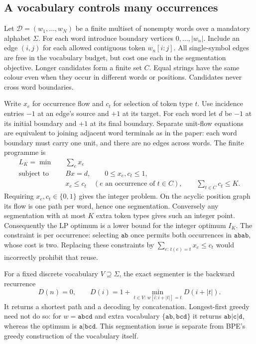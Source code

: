 \documentclass[11pt,oneside,openany]{book}
\theoremstyle{definition}\newtheorem{definition}[theorem]{Definition}
\theoremstyle{remark}\newtheorem{remark}[theorem]{Remark}
\begin{document}
\subsection{A vocabulary controls many occurrences}
Let $\mathcal D=(w_1,\ldots,w_N)$ be a finite multiset of nonempty words over
a mandatory alphabet $\Sigma$. For each word introduce boundary vertices
$0,\ldots,|w_n|$. Include an edge $(i,j)$ for each allowed contiguous token
$w_n[i:j]$. All single-symbol edges are free in the vocabulary budget,
but cost one each in the segmentation objective. Longer candidates form
a finite set $C$. Equal strings have the same colour even when they occur
in different words or positions. Candidates never cross word boundaries.

Write $x_e$ for occurrence flow and $c_t$ for selection of token type $t$.
Use incidence entries $-1$ at an edge's source and $+1$ at its target.
For each word let $d$ be $-1$ at its initial boundary and $+1$ at its final
boundary. Separate unit-flow equations are equivalent to joining adjacent
word terminals as in the paper: each word boundary must carry one unit,
and there are no edges across words. The finite programme is
\begin{equation}\label{convextok:lp}
 \begin{aligned}
 L_K=\min\quad &\sum_e x_e\\
 \text{subject to}\quad &Bx=d,\qquad 0\le x_e,c_t\le1,\\
 &x_e\le c_t\quad(e\text{ an occurrence of }t\in C),\qquad
 \sum_{t\in C}c_t\le K.
 \end{aligned}
\end{equation}
Requiring $x_e,c_t\in\{0,1\}$ gives the integer problem. On the acyclic
position graph its flow is one path per word, hence one segmentation.
Conversely any segmentation with at most $K$ extra token types gives such
an integer point. Consequently the LP optimum is a lower bound for the
integer optimum $I_K$. The constraint is per occurrence: selecting
$\mathtt{ab}$ once permits both occurrences in $\mathtt{abab}$, whose
cost is two. Replacing these constraints by
$\sum_{e:\,t(e)=t}x_e\le c_t$ would incorrectly prohibit that reuse.

For a fixed discrete vocabulary $V\supseteq\Sigma$, the exact segmenter is
the backward recurrence
\[
 D(n)=0,\qquad
 D(i)=1+\min_{t\in V:\,w[i:i+|t|]=t}D(i+|t|).
\]
It returns a shortest path and a decoding by concatenation. Longest-first
greedy need not do so: for $w=\mathtt{abcd}$ and extra vocabulary
$\{\mathtt{ab},\mathtt{bcd}\}$ it returns
$\mathtt{ab}|\mathtt c|\mathtt d$, whereas the optimum is
$\mathtt a|\mathtt{bcd}$. This segmentation issue is separate from BPE's
greedy construction of the vocabulary itself.
\end{document}
